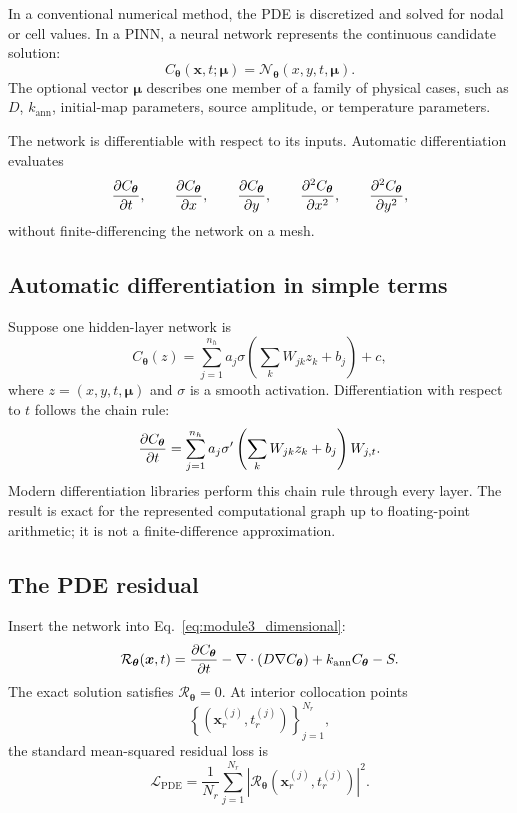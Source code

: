 \documentclass[11pt]{article}
\newcommand{\thetav}{\bm{\theta}}
\newcommand{\muv}{\bm{\mu}}
\newcommand{\xv}{\bm{x}}
\newcommand{\Cnet}{C_{\thetav}}
\newcommand{\Rnet}{\mathcal{R}_{\thetav}}
\newcommand{\Lpde}{\mathcal{L}_{\mathrm{PDE}}}
\begin{document}
In a conventional numerical method, the PDE is discretized and solved for nodal or cell values. In a PINN, a neural network represents the continuous candidate solution:
\begin{equation}
\Cnet(\xv,t;\muv)
=
\mathcal{N}_{\thetav}(x,y,t,\muv).
\label{eq:network_representation}
\end{equation}
The optional vector $\muv$ describes one member of a family of physical cases, such as $D$, $k_{\mathrm{ann}}$, initial-map parameters, source amplitude, or temperature parameters.

The network is differentiable with respect to its inputs. Automatic differentiation evaluates
\begin{equation}
\pdv{\Cnet}{t},
\qquad
\pdv{\Cnet}{x},
\qquad
\pdv{\Cnet}{y},
\qquad
\pdv[2]{\Cnet}{x},
\qquad
\pdv[2]{\Cnet}{y},
\end{equation}
without finite-differencing the network on a mesh.

\subsection{Automatic differentiation in simple terms}

Suppose one hidden-layer network is
\begin{equation}
\Cnet(z)=
\sum_{j=1}^{n_h}a_j
\sigma\left(\sum_{k}W_{jk}z_k+b_j\right)+c,
\end{equation}
where $z=(x,y,t,\muv)$ and $\sigma$ is a smooth activation. Differentiation with respect to $t$ follows the chain rule:
\begin{equation}
\pdv{\Cnet}{t}
=
\sum_{j=1}^{n_h}
a_j\sigma'\left(\sum_kW_{jk}z_k+b_j\right)W_{j,t}.
\end{equation}
Modern differentiation libraries perform this chain rule through every layer. The result is exact for the represented computational graph up to floating-point arithmetic; it is not a finite-difference approximation.

\subsection{The PDE residual}

Insert the network into Eq.~\eqref{eq:module3_dimensional}:
\begin{equation}
\Rnet(\xv,t)
=
\pdv{\Cnet}{t}
-\nabla\cdot(D\nabla\Cnet)
+k_{\mathrm{ann}}\Cnet
-S.
\label{eq:dimensional_residual}
\end{equation}
The exact solution satisfies $\Rnet=0$. At interior collocation points
\begin{equation}
\left\{
(\xv_r^{(j)},t_r^{(j)})
\right\}_{j=1}^{N_r},
\end{equation}
the standard mean-squared residual loss is
\begin{equation}
\Lpde
=
\frac{1}{N_r}\sum_{j=1}^{N_r}
\left|
\Rnet(\xv_r^{(j)},t_r^{(j)})
\right|^2.
\label{eq:global_pde_loss}
\end{equation}
\end{document}
